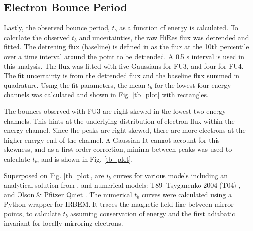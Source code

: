 \documentclass[draft,linenumbers]{agujournal}
\begin{document}
\subsection{Electron Bounce Period} \label{t_b} %
Lastly, the observed bounce period, $t_b$ as a function of energy is calculated. To calculate the observed $t_b$ and uncertainties, the raw HiRes flux was detrended and fitted. The detrening flux (baseline) is defined in \citet{O'Brien04} as the flux at the 10th percentile over a time interval around the point to be detrended. A 0.5 s interval is used in this analysis. The flux was fitted with five Gaussians for FU3, and four for FU4. The fit uncertainty is from the detrended flux and the baseline flux summed in quadrature. Using the fit parameters, the mean $t_b$ for the lowest four energy channels was calculated and shown in Fig. \ref{tb_plot} with rectangles. 

The bounces observed with FU3 are right-skewed in the lowest two energy channels. This hints at the underlying distribution of electron flux within the energy channel. Since the peaks are right-skewed, there are more electrons at the higher energy end of the channel. A Gaussian fit cannot account for this skewness, and as a first order correction, minima between peaks was used to calculate $t_b$, and is shown in Fig. \ref{tb_plot}.

Superposed on Fig. \ref{tb_plot}, are $t_b$ curves for various models including an analytical solution from \citet{Schulz74}, and numerical models: T89, Tsyganenko 2004 (T04) \citep{Tsyganenko05}, and Olson \& Pfitzer Quiet \citep{Olson82}. The numerical $t_b$ curves were calculated using a Python wrapper for IRBEM. It traces the magnetic field line between mirror points, to calculate $t_b$ assuming conservation of energy and the first adiabatic invariant for locally mirroring electrons. 

%
\end{document}
